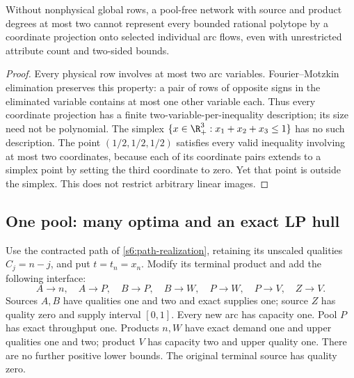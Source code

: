\begin{proposition}\label{s6:ports}
Without nonphysical global rows, a pool-free network with source and
product degrees at most two cannot represent every bounded rational
polytope by a coordinate projection onto selected individual arc flows,
even with unrestricted attribute count and two-sided bounds.
\end{proposition}
\begin{proof}
Every physical row involves at most two arc variables. Fourier--Motzkin
elimination preserves this property: a pair of rows of opposite signs
in the eliminated variable contains at most one other variable each.
Thus every coordinate projection has a finite two-variable-per-inequality
description; its size need not be polynomial. The simplex
$\{x\in\R_+^3:x_1+x_2+x_3\le1\}$ has no such description.
The point $(1/2,1/2,1/2)$ satisfies every valid inequality involving at
most two coordinates, because each of its coordinate pairs extends to
a simplex point by setting the third coordinate to zero. Yet that point
is outside the simplex. This does not restrict arbitrary linear images.
\end{proof}

\subsection{One pool: many optima and an exact LP hull}\label{s6:geometry}
Use the contracted path of \cref{s6:path-realization}, retaining its
unscaled qualities $C_j=n-j$, and put $t=t_n=x_n$. Modify its terminal
product and add the following interface:
\[
 A\to n,\quad A\to P,\quad B\to P,\quad B\to W,\quad
 P\to W,\quad P\to V,\quad Z\to V.
\]
Sources $A,B$ have qualities one and two and exact supplies one;
source $Z$ has quality zero and supply interval $[0,1]$. Every new arc
has capacity one. Pool $P$ has exact throughput one. Products $n,W$
have exact demand one and upper qualities one and two; product $V$ has
capacity two and upper quality one. There are no further positive
lower bounds. The original terminal source has quality zero.

